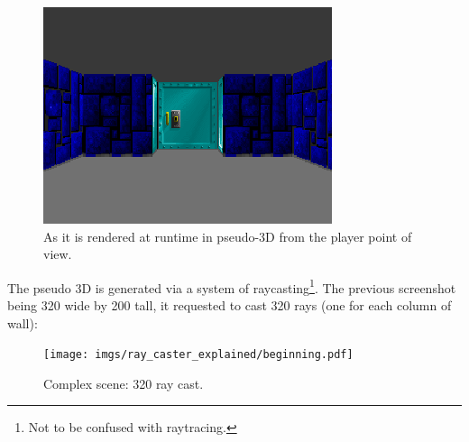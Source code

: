 \documentclass[book.tex]{subfiles}
\begin{document}
\begin{figure}[H]
  \centering
 \includegraphics[width=\textwidth]{imgs/ray_caster_explained/beginning.png}
 \caption{As it is rendered at runtime in pseudo-3D from the player point of view.} 
\end{figure}

 The pseudo 3D is generated via a system of raycasting\footnote{Not to be confused with raytracing.}. The previous screenshot being 320 wide by 200 tall, it requested to cast 320 rays (one for each column of wall):

\begin{figure}[H]
  \centering
  \texttt{[image: imgs/ray\_caster\_explained/beginning.pdf]}
 \caption{Complex scene: 320 ray cast.} 
\end{figure}
\end{document}
